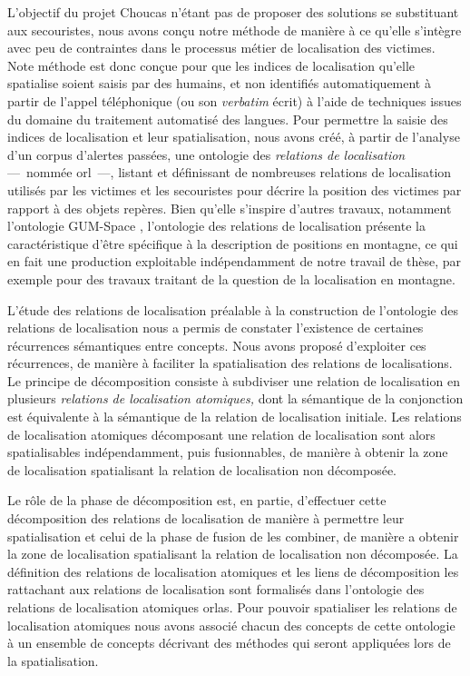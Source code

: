 L'objectif du projet Choucas n'étant pas de proposer des solutions se
substituant aux secouristes, nous avons conçu notre méthode de manière
à ce qu'elle s'intègre avec peu de contraintes dans le processus
métier de localisation des victimes. Note méthode est donc conçue pour
que les indices de localisation qu'elle spatialise soient saisis par
des humains, et non identifiés automatiquement à partir de l'appel
téléphonique (ou son \emph{verbatim} écrit) à l'aide de techniques
issues du domaine du traitement automatisé des langues. Pour permettre
la saisie des indices de localisation et leur spatialisation, nous
avons créé, à partir de l'analyse d'un corpus d'alertes passées, une
ontologie des \emph{relations de localisation} ---~nommée
\ac{orl}~---, listant et définissant de nombreuses relations de
localisation utilisés par les victimes et les secouristes pour décrire
la position des victimes par rapport à des objets repères. Bien
qu'elle s'inspire d'autres travaux, notamment l'ontologie GUM-Space
\autocite{Bateman2010}, l'ontologie des relations de localisation
présente la caractéristique d'être spécifique à la description de
positions en montagne, ce qui en fait une production exploitable
indépendamment de notre travail de thèse, par exemple pour des travaux
traitant de la question de la localisation en montagne.

L'étude des relations de localisation préalable à la construction de
l'ontologie des relations de localisation nous a permis de constater
l’existence de certaines récurrences sémantiques entre concepts. Nous
avons proposé d'exploiter ces récurrences, de manière à faciliter la
spatialisation des relations de localisations. Le principe de
décomposition consiste à subdiviser une relation de localisation en
plusieurs \emph{relations de localisation atomiques,} dont la
sémantique de la conjonction est équivalente à la sémantique de la
relation de localisation initiale. Les relations de localisation
atomiques décomposant une relation de localisation sont alors
spatialisables indépendamment, puis fusionnables, de manière à obtenir
la zone de localisation spatialisant la relation de localisation non
décomposée.

Le rôle de la phase de décomposition est, en partie, d'effectuer cette
décomposition des relations de localisation de manière à permettre
leur spatialisation et celui de la phase de fusion de les combiner, de
manière a obtenir la zone de localisation spatialisant la relation de
localisation non décomposée. La définition des relations de
localisation atomiques et les liens de décomposition les rattachant
aux relations de localisation sont formalisés dans l'ontologie des
relations de localisation atomiques \acp{orla}. Pour pouvoir
spatialiser les relations de localisation atomiques nous avons associé
chacun des concepts de cette ontologie à un ensemble de concepts
décrivant des méthodes qui seront appliquées lors de la
spatialisation.

